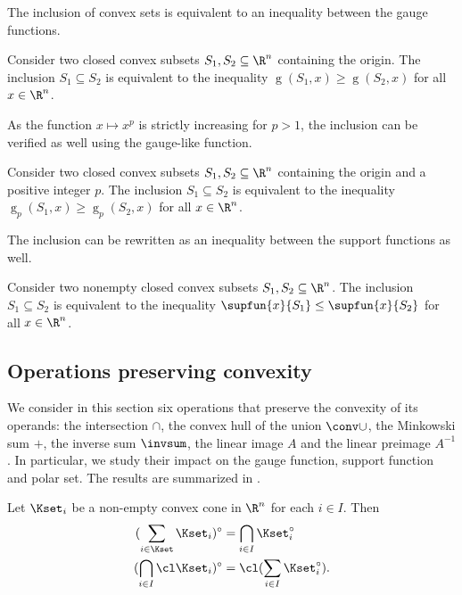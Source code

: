 \documentclass[11pt,twoside,a4paper,openright]{uclouvain-thesis}
\DeclareMathOperator{\gauge}{g}
\begin{document}
The inclusion of convex sets is equivalent to an inequality between the gauge functions.
\begin{myprop}
  \label{prop:gaugeincl}
  Consider two closed convex subsets $S_1, S_2 \subseteq \R^n$ containing the origin.
  The inclusion $S_1 \subseteq S_2$ is equivalent to the inequality
  $\gauge(S_1, x) \ge \gauge(S_2, x)$ for all $x \in \R^n$.
\end{myprop}
As the function $x \mapsto x^p$ is strictly increasing for $p > 1$,
the inclusion can be verified as well using the gauge-like function.
\begin{myprop}
  \label{prop:gaugelikeincl}
  Consider two closed convex subsets $S_1, S_2 \subseteq \R^n$ containing the origin and a positive integer $p$.
  The inclusion $S_1 \subseteq S_2$ is equivalent to the inequality
  $\gauge_p(S_1, x) \ge \gauge_p(S_2, x)$ for all $x \in \R^n$.
\end{myprop}
The inclusion can be rewritten as an inequality between the support functions as well.
\begin{myprop}
  \label{prop:supportincl}
  Consider two nonempty closed convex subsets $S_1, S_2 \subseteq \R^n$.
  The inclusion $S_1 \subseteq S_2$ is equivalent to the inequality
  $\supfun{x}{S_1} \le \supfun{x}{S_2}$ for all $x \in \R^n$.
\end{myprop}

\subsection{Operations preserving convexity}

We consider in this section six operations that preserve the convexity of its operands:
the intersection $\cap$, the convex hull of the union $\conv \cup$,
the Minkowski sum $+$, the inverse sum $\invsum$, the linear image $A$
and the linear preimage $A^{-1}$.
In particular, we study their impact on the gauge function, support function and polar set.
The results are summarized in .

\begin{mylem}
  \label{lem:sumcap}
  Let $\Kset_i$ be a non-empty convex cone in $\R^n$ for each $i \in I$.
  Then
  \begin{align*}
    (\sum_{i \in \Kset} \Kset_i)^\circ & = \bigcap_{i \in I} \Kset_i^\circ\\
    (\bigcap_{i \in I} \cl \Kset_i)^\circ & = \cl (\sum_{i \in I} \Kset_i^\circ).
  \end{align*}
\end{mylem}
\end{document}
